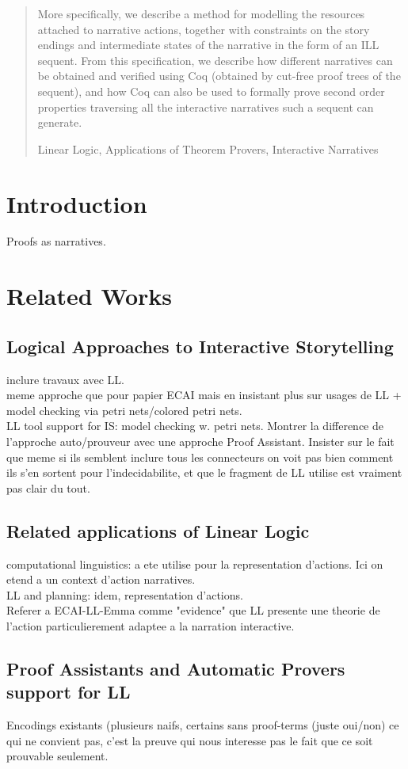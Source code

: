 \documentclass[runningheads,a4paper]{llncs}
\newcommand{\keywords}[1]{\par\addvspace\baselineskip
\noindent\keywordname\enspace\ignorespaces#1}
\begin{document}
\begin{abstract}
More specifically, we describe a method for modelling the resources attached to narrative actions, together with constraints on the story endings and intermediate states of the narrative in the form of an ILL sequent. From this specification, we describe how different narratives can be obtained and verified using Coq (obtained by cut-free proof trees of the sequent), and how Coq can also be used to formally prove second order properties traversing all the interactive narratives such a sequent can generate.
\keywords{Linear Logic, Applications of Theorem Provers, Interactive Narratives}
\end{abstract}


\section{Introduction}
Proofs as narratives.

\section{Related Works}
\subsection{Logical Approaches to Interactive Storytelling}
inclure travaux avec LL.\\
meme approche que pour papier ECAI mais en insistant plus sur usages de LL + model checking via petri nets/colored petri nets.\\
LL tool support for IS: model checking w. petri nets. Montrer la difference de l'approche auto/prouveur avec une approche Proof Assistant. Insister sur le fait que meme si ils semblent inclure tous les connecteurs on voit pas bien comment ils s'en sortent pour l'indecidabilite, et que le fragment de LL utilise est vraiment pas clair du tout.
\subsection{Related applications of Linear Logic}
computational linguistics: a ete utilise pour la representation d'actions. Ici on etend a un context d'action narratives.\\
LL and planning: idem, representation d'actions.\\
Referer a ECAI-LL-Emma comme "evidence" que LL presente une theorie de l'action particulierement adaptee a la narration interactive.
\subsection{Proof Assistants and Automatic Provers support for LL}
Encodings existants (plusieurs naifs, certains sans proof-terms (juste oui/non) ce qui ne convient pas, c'est la preuve qui nous interesse pas le fait que ce soit prouvable seulement. 
\end{document}

